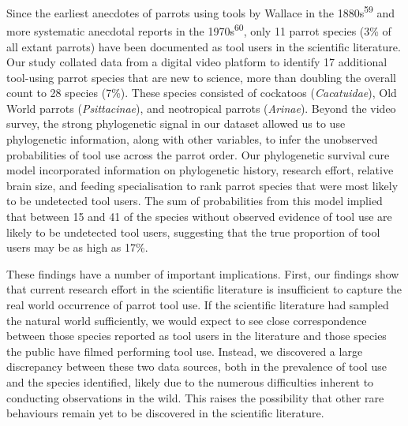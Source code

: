 \documentclass[
  man, donotrepeattitle,floatsintext]{apa6}
\begin{document}
Since the earliest anecdotes of parrots using tools by Wallace in the 1880s\textsuperscript{59} and more systematic anecdotal reports in the 1970s\textsuperscript{60},
only 11 parrot species (3\% of all extant parrots) have been documented as tool
users in the scientific literature. Our study collated data from a digital video
platform to identify 17 additional tool-using parrot species that are new to
science, more than doubling the overall count to 28 species (7\%). These species
consisted of cockatoos (\emph{Cacatuidae}), Old World parrots (\emph{Psittacinae}), and
neotropical parrots (\emph{Arinae}). Beyond the video survey, the strong
phylogenetic signal in our dataset allowed us to use phylogenetic information,
along with other variables, to infer the unobserved probabilities of tool use
across the parrot order. Our phylogenetic survival cure model incorporated
information on phylogenetic history, research effort, relative brain size, and
feeding specialisation to rank parrot species that were most likely to be
undetected tool users. The sum of probabilities from this model implied that
between 15 and 41 of the species without observed evidence of tool use are
likely to be undetected tool users, suggesting that the true proportion of tool
users may be as high as 17\%.

These findings have a number of important implications. First, our findings show
that current research effort in the scientific literature is insufficient to
capture the real world occurrence of parrot tool use. If the scientific
literature had sampled the natural world sufficiently, we would expect to see
close correspondence between those species reported as tool users in the
literature and those species the public have filmed performing tool use.
Instead, we discovered a large discrepancy between these two data sources, both
in the prevalence of tool use and the species identified, likely due to the
numerous difficulties inherent to conducting observations in the wild. This
raises the possibility that other rare behaviours remain yet to be discovered in
the scientific literature.
\end{document}
